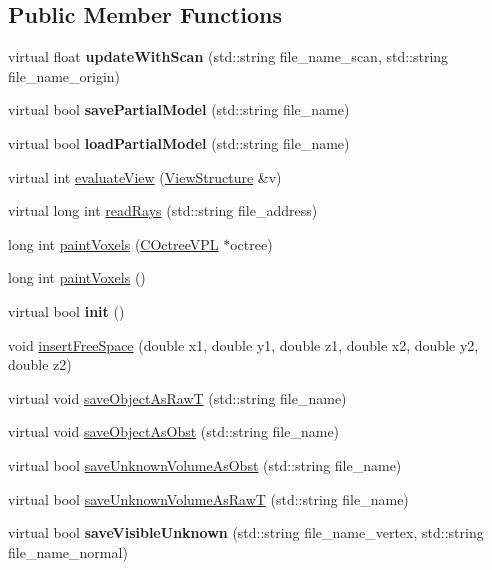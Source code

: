 \subsection*{Public Member Functions}
\begin{DoxyCompactItemize}
\item 
virtual float {\bfseries update\+With\+Scan} (std\+::string file\+\_\+name\+\_\+scan, std\+::string file\+\_\+name\+\_\+origin)\hypertarget{classPMVOctree_ae7dcde3f6d0186b480e4c466dc838069}{}\label{classPMVOctree_ae7dcde3f6d0186b480e4c466dc838069}

\item 
virtual bool {\bfseries save\+Partial\+Model} (std\+::string file\+\_\+name)\hypertarget{classPMVOctree_a9d43e80dbe4b31d2c8867d6044f89315}{}\label{classPMVOctree_a9d43e80dbe4b31d2c8867d6044f89315}

\item 
virtual bool {\bfseries load\+Partial\+Model} (std\+::string file\+\_\+name)\hypertarget{classPMVOctree_a05ea11ddb9ef9dc2f42bb3e12421178d}{}\label{classPMVOctree_a05ea11ddb9ef9dc2f42bb3e12421178d}

\item 
virtual int \hyperlink{classPMVOctree_a2f35ea94079904f2e336776cec14b234}{evaluate\+View} (\hyperlink{classViewStructure}{View\+Structure} \&v)
\item 
virtual long int \hyperlink{classPMVOctree_aea21d58041a90e416e35b1e30d8e4f2f}{read\+Rays} (std\+::string file\+\_\+address)
\item 
long int \hyperlink{classPMVOctree_ab94a5f29d9bab3fdf4b29211d7e8e2ed}{paint\+Voxels} (\hyperlink{classCOctreeVPL}{C\+Octree\+V\+PL} $\ast$octree)
\item 
long int \hyperlink{classPMVOctree_a6069af536fca552725d2c35b73f87329}{paint\+Voxels} ()
\item 
virtual bool {\bfseries init} ()\hypertarget{classPMVOctree_a0d9ee4ea4405227380ff8d2702194e65}{}\label{classPMVOctree_a0d9ee4ea4405227380ff8d2702194e65}

\item 
void \hyperlink{classPMVOctree_a12f82c34c03613a96023416be4f19016}{insert\+Free\+Space} (double x1, double y1, double z1, double x2, double y2, double z2)
\item 
virtual void \hyperlink{classPMVOctree_a774f55223acf795f52d3f73c8c9471cc}{save\+Object\+As\+RawT} (std\+::string file\+\_\+name)
\item 
virtual void \hyperlink{classPMVOctree_aca1c65f5363719f37247f80286a6154f}{save\+Object\+As\+Obst} (std\+::string file\+\_\+name)
\item 
virtual bool \hyperlink{classPMVOctree_aeafe9d9017283183e9d45824e2ef9c8a}{save\+Unknown\+Volume\+As\+Obst} (std\+::string file\+\_\+name)
\item 
virtual bool \hyperlink{classPMVOctree_a2d9c6839bb00a6c93129e34e1215fb9b}{save\+Unknown\+Volume\+As\+RawT} (std\+::string file\+\_\+name)
\item 
virtual bool {\bfseries save\+Visible\+Unknown} (std\+::string file\+\_\+name\+\_\+vertex, std\+::string file\+\_\+name\+\_\+normal)\hypertarget{classPMVOctree_a4bdf27fbd5933360a4dce4a45c1ff1a5}{}\label{classPMVOctree_a4bdf27fbd5933360a4dce4a45c1ff1a5}


\end{DoxyCompactItemize}
